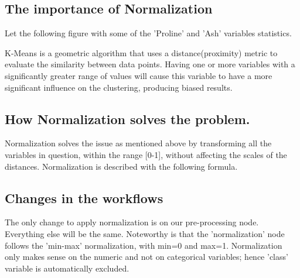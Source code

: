\documentclass[11pt]{article}
\begin{document}
		\subsection*{The importance of Normalization}
			Let the following figure with some of the 'Proline' and 'Ash' variables statistics.

			K-Means is a geometric algorithm that uses a distance(proximity) metric to evaluate the similarity between data points. Having one or more variables with a significantly greater range of values will cause this variable to have a more significant influence on the clustering, producing biased results.
		\subsection*{How Normalization solves the problem.}
			Normalization solves the issue as mentioned above by transforming all the variables in question, within the range [0-1], without affecting the scales of the distances. Normalization is described with the following formula.

		\subsection*{Changes in the workflows}
			The only change to apply normalization is on our pre-processing node. Everything else will be the same. Noteworthy is that the 'normalization' node follows the 'min-max' normalization, with min=0 and max=1. Normalization only makes sense on the numeric and not on categorical variables; hence 'class' variable is automatically excluded.

\end{document}
